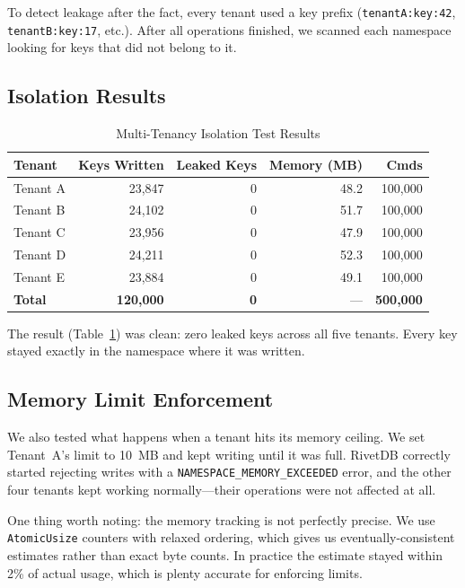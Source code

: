 \documentclass[conference,a4paper]{IEEEtran}
\begin{document}
To detect leakage after the fact, every tenant used a key prefix (\texttt{tenantA:key:42}, \texttt{tenantB:key:17}, etc.). After all operations finished, we scanned each namespace looking for keys that did not belong to it.

\subsection{Isolation Results}

\begin{table}[htbp]
\caption{Multi-Tenancy Isolation Test Results}
\label{tab:isolation}
\centering
\begin{tabular}{@{}lrrrr@{}}
\toprule
\textbf{Tenant} & \textbf{Keys Written} & \textbf{Leaked Keys} & \textbf{Memory (MB)} & \textbf{Cmds} \\
\midrule
Tenant A & 23,847 & 0 & 48.2 & 100,000 \\
Tenant B & 24,102 & 0 & 51.7 & 100,000 \\
Tenant C & 23,956 & 0 & 47.9 & 100,000 \\
Tenant D & 24,211 & 0 & 52.3 & 100,000 \\
Tenant E & 23,884 & 0 & 49.1 & 100,000 \\
\midrule
\textbf{Total} & \textbf{120,000} & \textbf{0} & --- & \textbf{500,000} \\
\bottomrule
\end{tabular}
\end{table}

The result (Table~\ref{tab:isolation}) was clean: zero leaked keys across all five tenants. Every key stayed exactly in the namespace where it was written.

\subsection{Memory Limit Enforcement}

We also tested what happens when a tenant hits its memory ceiling. We set Tenant~A's limit to 10~MB and kept writing until it was full. RivetDB correctly started rejecting writes with a \texttt{NAMESPACE\_MEMORY\_EXCEEDED} error, and the other four tenants kept working normally---their operations were not affected at all.

One thing worth noting: the memory tracking is not perfectly precise. We use \texttt{AtomicUsize} counters with relaxed ordering, which gives us eventually-consistent estimates rather than exact byte counts. In practice the estimate stayed within 2\% of actual usage, which is plenty accurate for enforcing limits.
\end{document}

